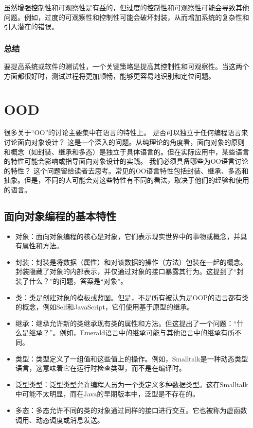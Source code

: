 \documentclass[]{ctexbook}
\begin{document}
虽然增强控制性和可观察性是有益的，但过度的控制性和可观察性可能会导致其他问题。例如，过度的可观察性和控制性可能会破坏封装，从而增加系统的复杂性和引入潜在的错误。

\subsection{总结}
要提高系统或软件的测试性，一个关键策略是提高其控制性和可观察性。当这两个方面都很好时，测试过程将更加顺畅，能够更容易地识别和定位问题。



\chapter{OOD}

很多关于“OO”的讨论主要集中在语言的特性上。
是否可以独立于任何编程语言来讨论面向对象设计？
这是一个深入的问题。从纯理论的角度看，面向对象的原则和概念（如封装、继承和多态）是独立于具体语言的。但在实际应用中，某些语言的特性可能会影响或指导面向对象设计的实践。
我们必须具备哪些为OO语言讨论的特性？
这个问题留给读者去思考。常见的OO语言特性包括封装、继承、多态和抽象。但是，不同的人可能会对这些特性有不同的看法，取决于他们的经验和使用的语言。


\section{面向对象编程的基本特性}
\begin{itemize}
    \item 对象：面向对象编程的核心是对象，它们表示现实世界中的事物或概念，并具有属性和方法。
    \item 封装：封装是将数据（属性）和对该数据的操作（方法）包装在一起的概念。封装隐藏了对象的内部表示，并仅通过对象的接口暴露其行为。这提到了“封装了什么？”的问题，答案是“对象”。
    \item 类：类是创建对象的模板或蓝图。但是，不是所有被认为是OOP的语言都有类的概念，例如Self和JavaScript，它们使用基于原型的继承。
    \item 继承：继承允许新的类继承现有类的属性和方法。但这提出了一个问题：“什么是继承？”。例如，Emerald语言中的继承可能与其他语言中的继承有所不同。
    \item 类型：类型定义了一组值和这些值上的操作。例如，Smalltalk是一种动态类型语言，这意味着它在运行时检查类型，而不是在编译时。
    \item 泛型类型：泛型类型允许编程人员为一个类定义多种数据类型。这在Smalltalk中可能不太明显，而在Java的早期版本中，泛型是不存在的。
    \item 多态：多态允许不同的类的对象通过同样的接口进行交互。它也被称为虚函数调用、动态调度或消息发送。
\end{itemize}
\end{document}
